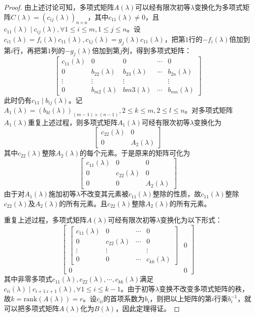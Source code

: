 \begin{proof}
            由上述讨论可知，多项式矩阵$A(\lambda)$可以经有限次初等$\lambda$变换化为多项式矩阵$C(\lambda)=(c_{ij}(\lambda))_{n\times n}$，其中$c_{11}(\lambda)\neq0$，且$c_{11}(\lambda)\mid c_{ij}(\lambda),\forall 1\leq i\leq m,1\leq j\leq n$。设$c_{i1}(\lambda)=f_i(\lambda)c_{11}(\lambda),c_{1j}(\lambda)=g_j(\lambda)c_{11}(\lambda)$，把第$1$行的$-f_i(\lambda)$倍加到第$i$行，再把第$1$列的$-g_j(\lambda)$倍加到第$j$列，得到多项式矩阵：
            \begin{equation} \begin{bmatrix}c_{11}(\lambda)&0&0&\cdots&0\\0&b_{22}(\lambda)&b_{23}(\lambda)&\cdots&b_{2n}(\lambda)\\\vdots&\vdots&\vdots&&\vdots\\0&b_{m2}(\lambda)&b{m3}(\lambda)&\cdots&b_{mn}(\lambda)\end{bmatrix}  \end{equation}
            此时仍有$c_{11}\mid b_{ij}(\lambda)$。记$A_1(\lambda)=(b_{kl}(\lambda))_{(m-1)\times(n-1)},2\leq k\leq m,2\leq l\leq n$。对多项式矩阵$A_1(\lambda)$重复上述过程，则多项式矩阵$A_1(\lambda)$可经有限次初等$\lambda$变换化为
            \[ \begin{bmatrix}c_{22}(\lambda)&0\\0&A_2(\lambda)\end{bmatrix} \]
            其中$c_{22}(\lambda)$整除$A_2(\lambda)$的每个元素。于是原来的矩阵可化为
            \begin{equation} \begin{bmatrix}c_{11}(\lambda)&0&0\\0&c_{22}(\lambda)&0\\0&0&A_2(\lambda)\end{bmatrix} \end{equation}
            由于对$A_1(\lambda)$施加初等$\lambda$不改变其元素被$c_{11}(\lambda)$整除的性质，故$c_{11}(\lambda)$整除$c_{22}(\lambda)$及$A_2(\lambda)$的所有元素。且$c_{22}(\lambda)$整除$A_2(\lambda)$的所有元素。

            重复上述过程，多项式矩阵$A(\lambda)$可经有限次初等$\lambda$变换化为以下形式：
            \[ \begin{bmatrix}\begin{bmatrix}c_{11}(\lambda)&0&\cdots&0\\0&c_{22}(\lambda)&\cdots&0\\\vdots&\vdots&&\vdots\\0&0&\cdots&c_{kk}(\lambda)\end{bmatrix}&0\\0&0\end{bmatrix} \]
            其中非零多项式$c_{11}(\lambda),c_{22}(\lambda),\cdots,c_{kk}(\lambda)$满足$c_{ii}(\lambda)\mid c_{i+1.i+1}(\lambda),\forall 1\leq i\leq k-1$。由于初等$\lambda$变换不改变多项式矩阵的秩，故$k=\mathrm{rank}(A(\lambda))=r$。设$c_{ii}$的首项系数为$b_i$，则把以上矩阵的第$i$行乘$b_i^{-1}$，就可以把多项式矩阵$A(\lambda)$化为$B(\lambda)$，因此定理得证。
        \end{proof}

